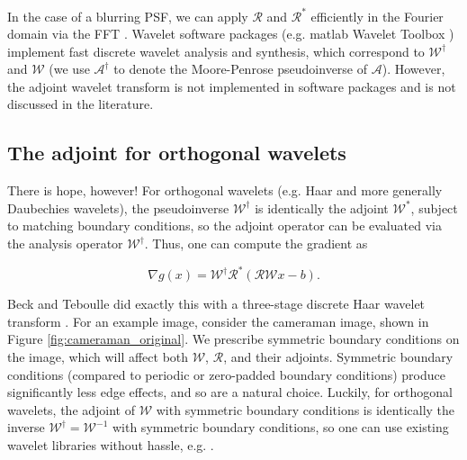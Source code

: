 \documentclass[journal]{IEEEtran}
\begin{document}
\noindent In the case of a blurring PSF, we can apply $\mathcal{R}$ and $\mathcal{R}^\ast$ efficiently in the Fourier domain via the FFT \cite{beck_2009, hansen_2006}.  Wavelet software packages (e.g. {\sc matlab} Wavelet Toolbox \cite{matlab_wt_2015}) implement fast discrete wavelet analysis and synthesis, which correspond to $\mathcal{W}^\dagger$ and $\mathcal{W}$ (we use $\mathcal{A}^\dagger$ to denote the Moore-Penrose pseudoinverse of $\mathcal{A}$).  However, the adjoint wavelet transform is not implemented in software packages and is not discussed in the literature.\\


\subsection{The adjoint for orthogonal wavelets}
There is hope, however!  For orthogonal wavelets (e.g. Haar and more generally Daubechies wavelets), the pseudoinverse $\mathcal{W}^\dagger$ is identically the adjoint $\mathcal{W}^\ast$, subject to matching boundary conditions, so the adjoint operator can be evaluated via the analysis operator $\mathcal{W}^\dagger$.  Thus, one can compute the gradient as

\[ \nabla g(x) = \mathcal{W}^\dagger \mathcal{R}^\ast \left(\mathcal{RW}x-b\right). \] 

\noindent Beck and Teboulle did exactly this with a three-stage discrete Haar wavelet transform \cite{beck_2009}.  For an example image, consider the cameraman image, shown in Figure \ref{fig:cameraman_original}.  We prescribe symmetric boundary conditions on the image, which will affect both $\mathcal{W}$, $\mathcal{R}$, and their adjoints.  Symmetric boundary conditions (compared to periodic or zero-padded boundary conditions) produce significantly less edge effects, and so are a natural choice.  Luckily, for orthogonal wavelets, the adjoint of $\mathcal{W}$ with symmetric boundary conditions is identically the inverse $\mathcal{W}^\dagger=\mathcal{W}^{-1}$ with symmetric boundary conditions, so one can use existing wavelet libraries without hassle, e.g. \cite{matlab_wt_2015}.\\
\end{document}
